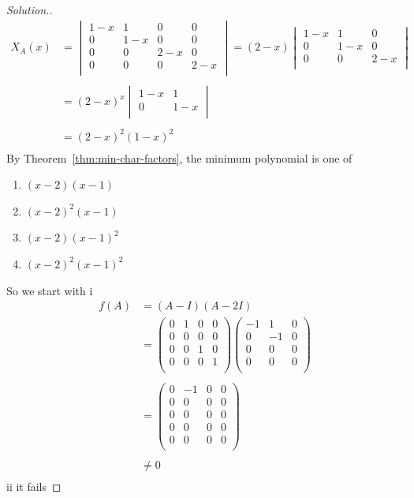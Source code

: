 \documentclass[11pt,a4paper]{article}
\theoremstyle{definition}
\newenvironment{solution}
  {\renewcommand{\qedsymbol}{}\begin{proof}[\textit{Solution}.]}
  {\end{proof}}
\begin{document}
\begin{solution}
\begin{align*}
X_A(x) &=
\begin{vmatrix}
1-x&1&0&0\\0&1-x&0&0\\0&0&2-x&0\\0&0&0&2-x\\
\end{vmatrix}
=(2-x)
\begin{vmatrix}
1-x&1&0\\0&1-x&0\\0&0&2-x\\
\end{vmatrix}\\\\
&=(2-x)^x
\begin{vmatrix}
1-x&1\\0&1-x\\
\end{vmatrix}\\\\
&=(2-x)^2(1-x)^2\\
\end{align*}
By Theorem~\ref{thm:min-char-factors}, the minimum polynomial is one of 
\begin{enumerate}
\item[i.] $(x-2)(x-1)$
\item[ii.] $(x-2)^2(x-1)$
\item[iii.] $(x-2)(x-1)^2$
\item[iv.] $(x-2)^2(x-1)^2$
\end{enumerate}
So we start with i
\begin{align*}
f(A) &=(A-I)(A-2I)\\
&=
\begin{pmatrix}
0&1&0&0\\0&0&0&0\\0&0&1&0\\0&0&0&1\\
\end{pmatrix}
\begin{pmatrix}
-1&1&0\\0&-1&0\\0&0&0\\0&0&0\\
\end{pmatrix}\\\\
&=
\begin{pmatrix}
0&-1&0&0\\0&0&0&0\\0&0&0&0\\0&0&0&0\\0&0&0&0\\
\end{pmatrix}\\\\
&\neq 0\\
\end{align*}
ii it fails


\end{solution}
\end{document}
